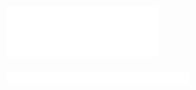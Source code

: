 \begin{frame}[plain]

  \begin{center}
    
 		\includegraphics[width=5cm]{fig/brand/logo-en-inverted-large.pdf}

  	\vspace*{15mm}    
    

  	\vspace*{20mm}    

    \includegraphics[width=6cm]{fig/brand/slogan-en-one-line-inverted-large.pdf}
  \end{center}


\end{frame}

\renewcommand{\arraystretch}{1}